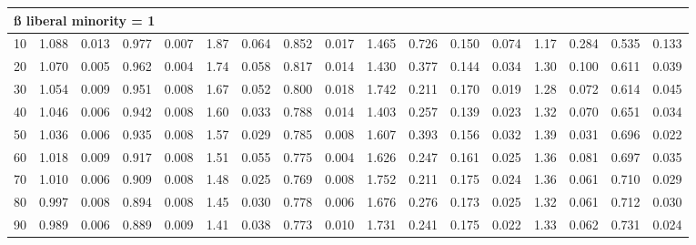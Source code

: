 \documentclass[
]{article}
\begin{document}
\begin{table}[H]
\begin{table}
{\begin{tabular}{r|r|r|r|r|r|r|r|r|r|r|r|r|r|r|r|r}
\hline
\multicolumn{17}{l}{\textbf{ß liberal minority = 1}}\\
\hline
\hspace{1em}10 & 1.088 & 0.013 & 0.977 & 0.007 & 1.87 & 0.064 & 0.852 & 0.017 & 1.465 & 0.726 & 0.150 & 0.074 & 1.17 & 0.284 & 0.535 & 0.133\\
\hline
\hspace{1em}20 & 1.070 & 0.005 & 0.962 & 0.004 & 1.74 & 0.058 & 0.817 & 0.014 & 1.430 & 0.377 & 0.144 & 0.034 & 1.30 & 0.100 & 0.611 & 0.039\\
\hline
\hspace{1em}30 & 1.054 & 0.009 & 0.951 & 0.008 & 1.67 & 0.052 & 0.800 & 0.018 & 1.742 & 0.211 & 0.170 & 0.019 & 1.28 & 0.072 & 0.614 & 0.045\\
\hline
\hspace{1em}40 & 1.046 & 0.006 & 0.942 & 0.008 & 1.60 & 0.033 & 0.788 & 0.014 & 1.403 & 0.257 & 0.139 & 0.023 & 1.32 & 0.070 & 0.651 & 0.034\\
\hline
\hspace{1em}50 & 1.036 & 0.006 & 0.935 & 0.008 & 1.57 & 0.029 & 0.785 & 0.008 & 1.607 & 0.393 & 0.156 & 0.032 & 1.39 & 0.031 & 0.696 & 0.022\\
\hline
\hspace{1em}60 & 1.018 & 0.009 & 0.917 & 0.008 & 1.51 & 0.055 & 0.775 & 0.004 & 1.626 & 0.247 & 0.161 & 0.025 & 1.36 & 0.081 & 0.697 & 0.035\\
\hline
\hspace{1em}70 & 1.010 & 0.006 & 0.909 & 0.008 & 1.48 & 0.025 & 0.769 & 0.008 & 1.752 & 0.211 & 0.175 & 0.024 & 1.36 & 0.061 & 0.710 & 0.029\\
\hline
\hspace{1em}80 & 0.997 & 0.008 & 0.894 & 0.008 & 1.45 & 0.030 & 0.778 & 0.006 & 1.676 & 0.276 & 0.173 & 0.025 & 1.32 & 0.061 & 0.712 & 0.030\\
\hline
\hspace{1em}90 & 0.989 & 0.006 & 0.889 & 0.009 & 1.41 & 0.038 & 0.773 & 0.010 & 1.731 & 0.241 & 0.175 & 0.022 & 1.33 & 0.062 & 0.731 & 0.024\\
\hline
\end{tabular}}
\end{table}
\end{table}
\end{document}
